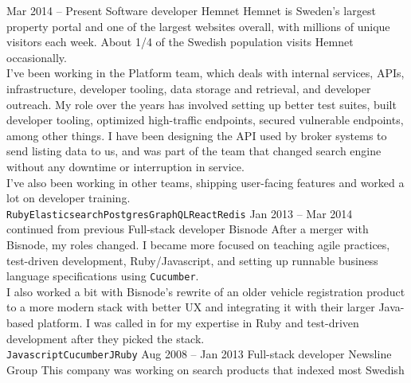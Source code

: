 \documentclass[9pt]{developercv} %
\begin{document}

\pagebreak
{}

\begin{entrylist}
	\entry
		{Mar 2014 -- Present}
		{Software developer}
		{Hemnet}
    {Hemnet is Sweden's largest property portal and one of the largest websites
      overall, with millions of unique visitors each week. About 1/4 of the
      Swedish population visits Hemnet occasionally.\\ I've been working in the
      Platform team, which deals with internal services, APIs, infrastructure,
      developer tooling, data storage and retrieval, and developer outreach. My
      role over the years has involved setting up better test suites, built
      developer tooling, optimized high-traffic endpoints, secured vulnerable
      endpoints, among other things. I have been designing the API used by
      broker systems to send listing data to us, and was part of the team that
      changed search engine without any downtime or interruption in service.\\
      I've also been working in other teams, shipping user-facing features and
      worked a lot on developer training.\\
      \texttt{Ruby}\slashsep\texttt{Elasticsearch}\slashsep\texttt{Postgres}\slashsep\texttt{GraphQL}\slashsep\texttt{React}\slashsep\texttt{Redis}}
	\entry
		{Jan 2013 -- Mar 2014\\\footnotesize{continued from previous}}
		{Full-stack developer}
		{Bisnode}
    {After a merger with Bisnode, my roles changed. I became more focused on
      teaching agile practices, test-driven development, Ruby/Javascript, and
      setting up runnable business language specifications using
      \texttt{Cucumber}.\\ I also worked a bit with Bisnode's rewrite of an
      older vehicle registration product to a more modern stack with better
      UX and integrating it with their larger Java-based platform. I was called
      in for my expertise in Ruby and test-driven development after they picked
      the stack.\\
      \texttt{Javascript}\slashsep\texttt{Cucumber}\slashsep\texttt{JRuby}}
	\entry
		{Aug 2008 -- Jan 2013}
		{Full-stack developer}
		{Newsline Group}
    {This company was working on search products that indexed most Swedish
}
\end{entrylist}
\end{document}
